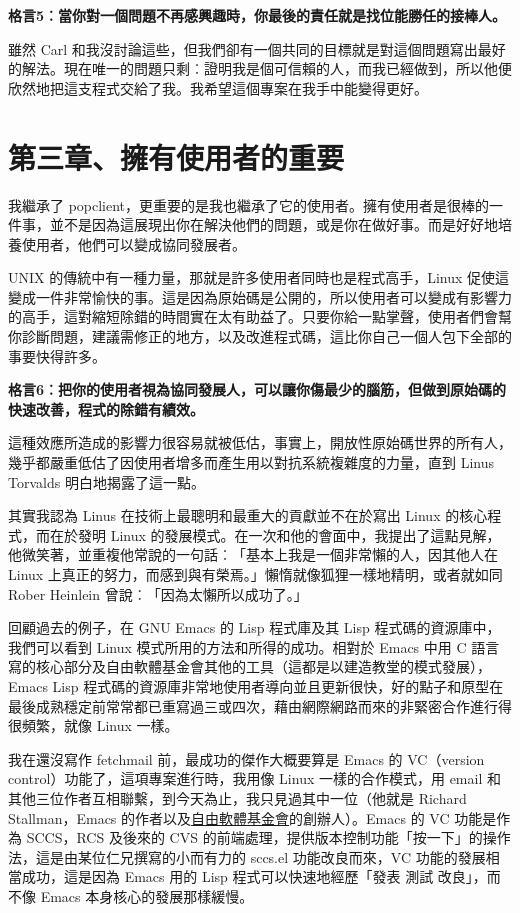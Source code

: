 \documentclass[10pt, b5paper]{book}
\makeatletter
\newcommand*{\shifttext}[2]{%
  \settowidth{\@tempdima}{#2}%
  \makebox[\@tempdima]{\hspace*{#1}#2}%
}
\makeatother
\begin{document}
\textbf{格言5︰當你對一個問題不再感興趣時，你最後的責任就是找位能勝任的接棒人。}

雖然 Carl
和我沒討論這些，但我們卻有一個共同的目標就是對這個問題寫出最好的解法。現在唯一的問題只剩︰證明我是個可信賴的人，而我已經做到，所以他便欣然地把這支程式交給了我。我希望這個專案在我手中能變得更好。

\newpage
\section{第三章、擁有使用者的重要}

我繼承了
popclient，更重要的是我也繼承了它的使用者。擁有使用者是很棒的一件事，並不是因為這展現出你在解決他們的問題，或是你在做好事。而是好好地培養使用者，他們可以變成協同發展者。

UNIX 的傳統中有一種力量，那就是許多使用者同時也是程式高手，Linux
促使這變成一件非常愉快的事。這是因為原始碼是公開的，所以使用者可以變成有影響力的高手，這對縮短除錯的時間實在太有助益了。只要你給一點掌聲，使用者們會幫你診斷問題，建議需修正的地方，以及改進程式碼，這比你自己一個人包下全部的事要快得許多。

\textbf{格言6︰把你的使用者視為協同發展人，可以讓你傷最少的腦筋，但做到原始碼的快速改善，程式的除錯有績效。}

這種效應所造成的影響力很容易就被低估，事實上，開放性原始碼世界的所有人，幾乎都嚴重低估了因使用者增多而產生用以對抗系統複雜度的力量，直到
Linus Torvalds 明白地揭露了這一點。

其實我認為 Linus 在技術上最聰明和最重大的貢獻並不在於寫出 Linux
的核心程式，而在於發明 Linux
的發展模式。在一次和他的會面中，我提出了這點見解，他微笑著，並重複他常說的一句話︰「基本上我是一個非常懶的人，因其他人在
Linux 上真正的努力，而感到與有榮焉。」懶惰就像狐狸一樣地精明，或者就如同
Rober Heinlein 曾說︰「因為太懶所以成功了。」

回顧過去的例子，在 GNU Emacs 的 Lisp 程式庫及其 Lisp
程式碼的資源庫中，我們可以看到 Linux 模式所用的方法和所得的成功。相對於
Emacs 中用 C
語言寫的核心部分及自由軟體基金會其他的工具（這都是以建造教堂的模式發展），Emacs
Lisp
程式碼的資源庫非常地使用者導向並且更新很快，好的點子和原型在最後成熟穩定前常常都已重寫過三或四次，藉由網際網路而來的非緊密合作進行得很頻繁，就像
Linux 一樣。

我在還沒寫作 fetchmail 前，最成功的傑作大概要算是 Emacs 的 VC（version
control）功能了，這項專案進行時，我用像 Linux 一樣的合作模式，用 email
和其他三位作者互相聯繫，到今天為止，我只見過其中一位（他就是 Richard
Stallman，Emacs
的作者以及\href{http://www.fsf.org}{自由軟體基金會}的創辦人）。Emacs 的
VC 功能是作為 SCCS，RCS 及後來的 CVS
的前端處理，提供版本控制功能「按一下」的操作法，這是由某位仁兄撰寫的小而有力的
sccs.el 功能改良而來，VC 功能的發展相當成功，這是因為 Emacs 用的 Lisp
程式可以快速地經歷「發表 \shifttext{1pt}{---}\shifttext{-1pt}{---} 測試 \shifttext{1pt}{---}\shifttext{-1pt}{---} 改良」，而不像 Emacs
本身核心的發展那樣緩慢。
\end{document}
